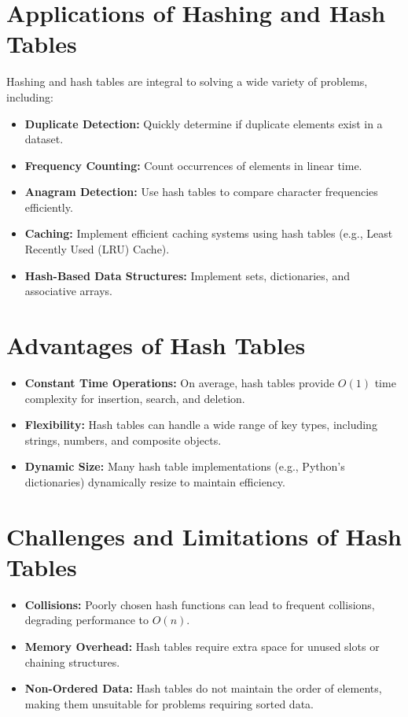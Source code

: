\section*{Applications of Hashing and Hash Tables}
Hashing and hash tables are integral to solving a wide variety of problems, including:
\begin{itemize}
    \item \textbf{Duplicate Detection:} Quickly determine if duplicate elements exist in a dataset.
    \item \textbf{Frequency Counting:} Count occurrences of elements in linear time.
    \item \textbf{Anagram Detection:} Use hash tables to compare character frequencies efficiently.
    \item \textbf{Caching:} Implement efficient caching systems using hash tables (e.g., Least Recently Used (LRU) Cache).
    \item \textbf{Hash-Based Data Structures:} Implement sets, dictionaries, and associative arrays.
\end{itemize}

\section*{Advantages of Hash Tables}
\begin{itemize}
    \item \textbf{Constant Time Operations:} On average, hash tables provide \(O(1)\) time complexity for insertion, search, and deletion.
    \item \textbf{Flexibility:} Hash tables can handle a wide range of key types, including strings, numbers, and composite objects.
    \item \textbf{Dynamic Size:} Many hash table implementations (e.g., Python’s dictionaries) dynamically resize to maintain efficiency.
\end{itemize}

\section*{Challenges and Limitations of Hash Tables}
\begin{itemize}
    \item \textbf{Collisions:} Poorly chosen hash functions can lead to frequent collisions, degrading performance to \(O(n)\).
    \item \textbf{Memory Overhead:} Hash tables require extra space for unused slots or chaining structures.
    \item \textbf{Non-Ordered Data:} Hash tables do not maintain the order of elements, making them unsuitable for problems requiring sorted data.
\end{itemize}

